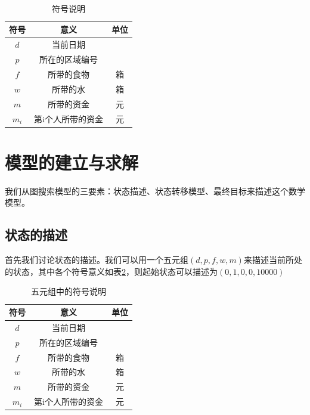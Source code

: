 \documentclass[withoutpreface,bwprint]{cumcmthesis} %
\begin{document}
\begin{table}[!htbp]
    \caption{符号说明}\label{tab:001} \centering
    \begin{tabular}{ccc}
        \toprule[1.5pt]
        符号 & 意义 & 单位\\
        \midrule[1pt]
        $d$ & 当前日期 & \\
        $p$ & 所在的区域编号 & \\
        $f$ & 所带的食物 & 箱\\
        $w$ & 所带的水 & 箱\\
        $m$ & 所带的资金 & 元\\
        $m_i$ & 第i个人所带的资金 & 元\\
        \bottomrule[1.5pt]
    \end{tabular}
\end{table}

\section{模型的建立与求解}

我们从图搜索模型的三要素：状态描述、状态转移模型、最终目标来描述这个数学模型。

\subsection{状态的描述}
首先我们讨论状态的描述。我们可以用一个五元组\((d,p,f,w,m)\)来描述当前所处的状态，其中各个符号意义如表\ref{zt}，则起始状态可以描述为\((0,1,0,0,10000)\)
\begin{table}[!htbp]
    \caption{五元组中的符号说明}\label{tab:001} \centering
    \begin{tabular}{ccc}
        \toprule[1.5pt]
        符号 & 意义 & 单位\\
        \midrule[1pt]
        $d$ & 当前日期 & \\
        $p$ & 所在的区域编号 & \\
        $f$ & 所带的食物 & 箱\\
        $w$ & 所带的水 & 箱\\
        $m$ & 所带的资金 & 元\\
        $m_i$ & 第i个人所带的资金 & 元\\
        \bottomrule[1.5pt]
    \end{tabular}
    \label{zt}
\end{table}
\end{document}
